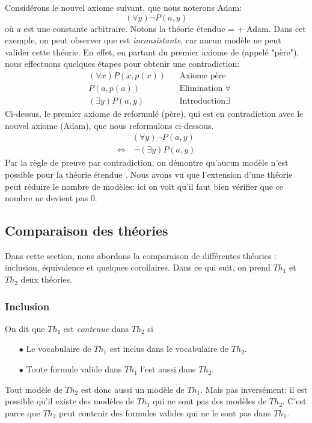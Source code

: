 {Considérons le nouvel axiome suivant, que nous noterons Adam:
$$ (\forall y) \neg P(a,y) $$
où $a$ est une constante arbitraire.
Notons la théorie étendue  =  + Adam. Dans cet exemple, on peut observer que 
est {\em inconsistante}, car aucun modèle ne peut valider cette théorie.
En effet, en partant du premier axiome de  (appelé "père"), nous effectuons quelques étapes pour obtenir une contradiction:
\begin{align*}
& (\forall x) P(x,p(x)) && \textrm{Axiome père} \\
& P(a,p(a)) && \textrm{Elimination } \forall \\
& (\exists y) P(a,y) && \textrm{Introduction} \exists
\end{align*}
Ci-dessus, le premier axiome de  reformulé (père),
qui est en contradiction avec le nouvel axiome (Adam), que nous reformulons ci-dessous.
\begin{align*}
& (\forall y) \neg P(a,y) \\
\Leftrightarrow & \ \neg (\exists y) P(a,y)
\end{align*}
Par la règle de preuve par contradiction, on démontre qu'aucun modèle n'est possible pour la théorie étendue .
Nous avons vu que
l'extension d'une théorie peut réduire le nombre de modèles: ici on voit qu'il faut bien vérifier que ce nombre ne devient pas 0.

\subsection{Comparaison des théories}

Dans cette section, nous abordons la comparaison de différentes théories :
inclusion, équivalence et quelques corollaires.
Dans ce qui suit, on prend $Th_1$ et $Th_2$ deux théories.

\subsubsection{Inclusion}
On dit que $Th_1$ est {\em contenue} dans $Th_2$ si
\begin{itemize}
\item[$\bullet$] Le vocabulaire de $Th_1$ est inclus dans le vocabulaire de $Th_2$.
\item[$\bullet$] Toute formule valide dans $Th_1$ l'est aussi dans $Th_2$.
\end{itemize}
Tout modèle de $Th_2$ est donc aussi un modèle de $Th_1$.
Mais pas inversément: il est possible qu'il existe des modèles de $Th_1$ qui ne sont pas des modèles de $Th_2$.
C'est parce que $Th_2$ peut contenir des formules valides qui ne le sont pas dans $Th_1$.

}
